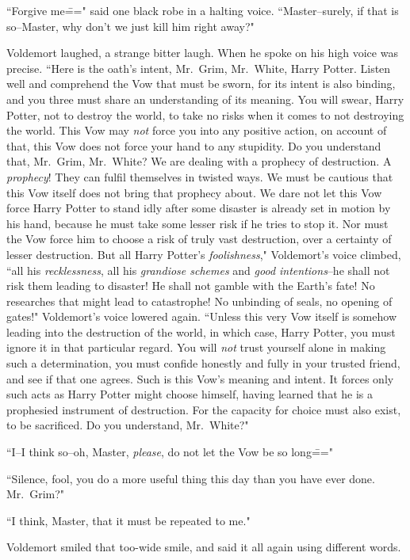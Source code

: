 ``Forgive me\===" said one black robe in a halting voice. ``Master\---surely, if that is so\---Master, why don't we just kill him right away?"

Voldemort laughed, a strange bitter laugh. When he spoke on his high voice was precise. ``Here is the oath's intent, Mr.~Grim, Mr.~White, Harry Potter. Listen well and comprehend the Vow that must be sworn, for its intent is also binding, and you three must share an understanding of its meaning. You will swear, Harry Potter, not to destroy the world, to take no risks when it comes to not destroying the world. This Vow may \emph{not} force you into any positive action, on account of that, this Vow does not force your hand to any stupidity. Do you understand that, Mr.~Grim, Mr.~White? We are dealing with a prophecy of destruction. A \emph{prophecy}! They can fulfil themselves in twisted ways. We must be cautious that this Vow itself does not bring that prophecy about. We dare not let this Vow force Harry Potter to stand idly after some disaster is already set in motion by his hand, because he must take some lesser risk if he tries to stop it. Nor must the Vow force him to choose a risk of truly vast destruction, over a certainty of lesser destruction. But all Harry Potter's \emph{foolishness}," Voldemort's voice climbed, ``all his \emph{recklessness}, all his \emph{grandiose schemes} and \emph{good intentions}\---he shall not risk them leading to disaster! He shall not gamble with the Earth's fate! No researches that might lead to catastrophe! No unbinding of seals, no opening of gates!" Voldemort's voice lowered again. ``Unless this very Vow itself is somehow leading into the destruction of the world, in which case, Harry Potter, you must ignore it in that particular regard. You will \emph{not} trust yourself alone in making such a determination, you must confide honestly and fully in your trusted friend, and see if that one agrees. Such is this Vow's meaning and intent. It forces only such acts as Harry Potter might choose himself, having learned that he is a prophesied instrument of destruction. For the capacity for choice must also exist, to be sacrificed. Do you understand, Mr.~White?"

``I\---I think so\---oh, Master, \emph{please}, do not let the Vow be so long\==="

``Silence, fool, you do a more useful thing this day than you have ever done. Mr.~Grim?"

``I think, Master, that it must be repeated to me."

Voldemort smiled that too-wide smile, and said it all again using different words.

